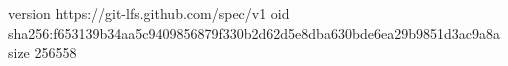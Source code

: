 version https://git-lfs.github.com/spec/v1
oid sha256:f653139b34aa5c9409856879f330b2d62d5e8dba630bde6ea29b9851d3ac9a8a
size 256558
